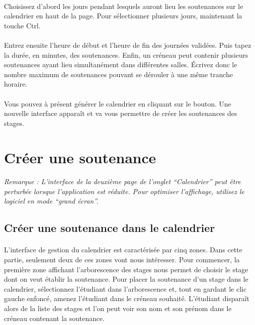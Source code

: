 \documentclass[a4paper,10pt]{book}
\begin{document}
      \paragraph{}
	Choisissez d'abord les jours pendant lesquels auront lieu les soutenances sur le calendrier en haut de la page.
	Pour sélectionner plusieurs jours, maintenant la touche Ctrl.
      
      \paragraph{}
	Entrez ensuite l'heure de début et l'heure de fin des journées validées.
	Puis tapez la durée, en minutes, des soutenances.
	Enfin, un créneau peut contenir plusieurs soutenances ayant lieu simultanément dans différentes salles.
	Écrivez donc le nombre maximum de soutenances pouvant se dérouler à une même tranche horaire.
      
      \paragraph{}
	Vous pouvez à présent générer le calendrier en cliquant sur le bouton.
	Une nouvelle interface apparaît et va vous permettre de créer les soutenances des stages.
      
      
    \section{Créer une soutenance}
    
	\paragraph{}
	  \textit{Remarque : L'interface de la deuxième page de l'onglet ``Calendrier'' peut être perturbée lorsque l'application est réduite. Pour optimiser l'affichage, utilisez le logiciel en mode ``grand écran''.}
    
      \subsection{Créer une soutenance dans le calendrier}
	\paragraph{}
	  L'interface de gestion du calendrier est caractérisée par cinq zones.
	  Dans cette partie, seulement deux de ces zones vont nous intéresser.
	  Pour commencer, la première zone affichant l'arborescence des stages nous permet de choisir le stage dont on veut établir la soutenance.
	  Pour placer la soutenance d'un stage dans le calendrier, sélectionnez l'étudiant dans l'arborescence et, tout en gardant le clic gauche enfoncé, amenez l'étudiant dans le créneau souhaité.
	  L'étudiant disparaît alors de la liste des stages et l'on peut voir son nom et son prénom dans le créneau contenant la soutenance.
	  
\end{document}
